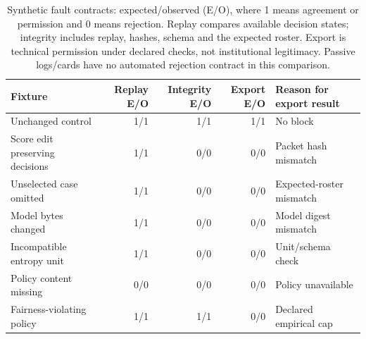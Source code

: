 \begin{table}[t]
\centering\small
\caption{Synthetic fault contracts: expected/observed (E/O), where 1 means agreement or permission and 0 means rejection. Replay compares available decision states; integrity includes replay, hashes, schema and the expected roster. Export is technical permission under declared checks, not institutional legitimacy. Passive logs/cards have no automated rejection contract in this comparison.}
\label{tab:fault-contracts}
\begin{tabularx}{\textwidth}{XrrrX}
\toprule
Fixture & Replay E/O & Integrity E/O & Export E/O & Reason for export result \\
\midrule
Unchanged control & 1/1 & 1/1 & 1/1 & No block \\
Score edit preserving decisions & 1/1 & 0/0 & 0/0 & Packet hash mismatch \\
Unselected case omitted & 1/1 & 0/0 & 0/0 & Expected-roster mismatch \\
Model bytes changed & 1/1 & 0/0 & 0/0 & Model digest mismatch \\
Incompatible entropy unit & 1/1 & 0/0 & 0/0 & Unit/schema check \\
Policy content missing & 0/0 & 0/0 & 0/0 & Policy unavailable \\
Fairness-violating policy & 1/1 & 1/1 & 0/0 & Declared empirical cap \\
\bottomrule
\end{tabularx}
\end{table}
